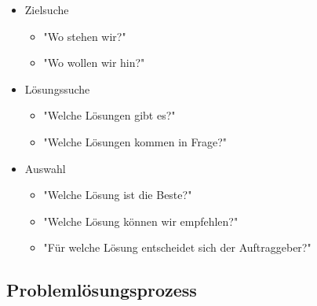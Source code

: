 \documentclass{article}
\begin{document}
	\begin{itemize}
		\item{Zielsuche}
		\begin{itemize}
			\item{"Wo stehen wir?"}
			\item{"Wo wollen wir hin?"}
		\end{itemize}
		\item{Lösungssuche}
		\begin{itemize}
			\item{"Welche Lösungen gibt es?"}
			\item{"Welche Lösungen kommen in Frage?"}
		\end{itemize}
		\item{Auswahl}
		\begin{itemize}
			\item{"Welche Lösung ist die Beste?"}
			\item{"Welche Lösung können wir empfehlen?"}
			\item{"Für welche Lösung entscheidet sich der Auftraggeber?"}
		\end{itemize}
	\end{itemize}
	\subsection{Problemlösungsprozess}
\end{document}
